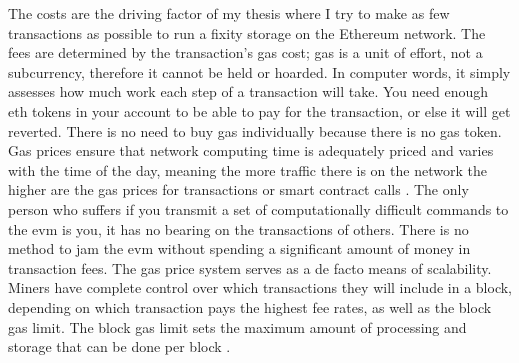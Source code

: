 \documentclass[final]{vutinfth}
\begin{document}
The costs are the driving factor of my thesis where I try to make as few transactions as possible to run a fixity storage on the Ethereum network. 
The fees are determined by the transaction's gas cost; gas is a unit of effort, not a subcurrency, therefore it cannot be held or hoarded. In computer words, it simply assesses how much work each step of a transaction will take. You need enough \acrlong{eth} tokens in your account to be able to pay for the transaction, or else it will get reverted. There is no need to buy gas individually because there is no gas token. Gas prices ensure that network computing time is adequately priced and varies with the time of the day, meaning the more traffic there is on the network the higher are the gas prices for transactions or smart contract calls \cite[59]{dannen2017introducing}.
The only person who suffers if you transmit a set of computationally difficult commands to the \acrshort{evm} is you, it has no bearing on the transactions of others. There is no method to jam the \acrlong{evm} without spending a significant amount of money in transaction fees. The gas price system serves as a de facto means of scalability. Miners have complete control over which transactions they will include in a block, depending on which transaction pays the highest fee rates, as well as the block gas limit. The block gas limit sets the maximum amount of processing and storage that can be done per block \cite[60]{dannen2017introducing}. 
\end{document}
